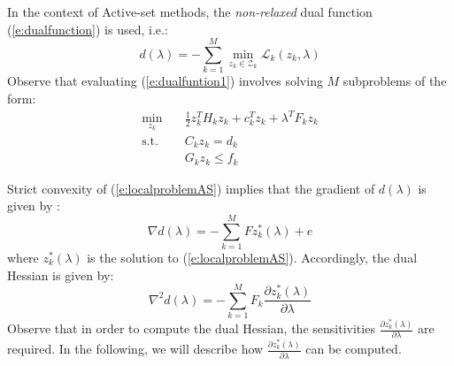 In the context of Active-set methods, the \emph{non-relaxed} dual function (\ref{e:dualfunction}) is used, i.e.:
\begin{equation}
\label{e:dualfuntion1}
d(\lambda) = -\sum_{k=1}^M \min_{z_k \in \mathcal{Z}_k} \mathcal{L}_k(z_k,\lambda)
\end{equation}
Observe that evaluating (\ref{e:dualfuntion1}) involves solving $M$ subproblems of the form:
\begin{subequations}
\label{e:localproblemAS}
\begin{align}
\min_{z_k} & \quad \frac{1}{2}z_k^T H_k z_k + c_k^T z_k + \lambda^TF_k z_k \\
\text{s.t.} & \quad C_k z_k = d_k \label{e:dynamicsAS} \\ 
& \quad G_k z_k \leq f_k \label{e:ineqConstAS}
\end{align}
\end{subequations}

Strict convexity of (\ref{e:localproblemAS}) implies that the gradient of $d(\lambda)$ is given by \cite{Bertsekas1989}:
\begin{equation}
\nabla d(\lambda) = -\sum_{k=1}^M F z_k^*(\lambda) + e
\end{equation}
where $z_k^*(\lambda)$ is the solution to (\ref{e:localproblemAS}). Accordingly, the dual Hessian is given by:
\begin{equation} \label{e:HessianAS}
\nabla^2 d(\lambda) = -\sum_{k=1}^M F_k \frac{\partial z_k^*(\lambda)}{\partial \lambda}
\end{equation}
Observe that in order to compute the dual Hessian, the sensitivities $\frac{\partial z_k^*(\lambda)}{\partial \lambda}$ are required. In the following, we will describe how $\frac{\partial z_k^*(\lambda)}{\partial \lambda}$ can be computed.

